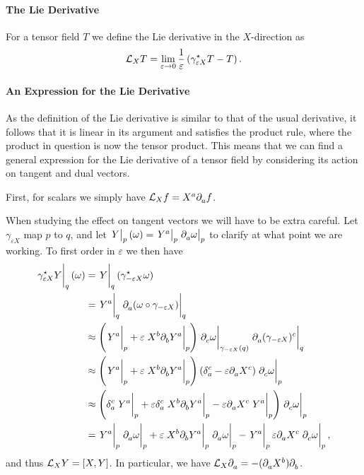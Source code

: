 \paragraph{The Lie Derivative}
For a tensor field $T$ we define the Lie derivative in the $X$-direction as
\begin{align*}
\mathcal{L}_{X}T = \lim\limits_{\varepsilon\to 0}\frac{1}{\varepsilon}\left(\gamma_{\varepsilon X}^{\star}T - T\right).
\end{align*}

\paragraph{An Expression for the Lie Derivative}
As the definition of the Lie derivative is similar to that of the usual derivative, it follows that it is linear in its argument and satisfies the product rule, where the product in question is now the tensor product. This means that we can find a general expression for the Lie derivative of a tensor field by considering its action on tangent and dual vectors.

First, for scalars we simply have $\mathcal{L}_{X}f = X^{a}\partial^{}_{a}f$.

When studying the effect on tangent vectors we will have to be extra careful. Let $\gamma_{\varepsilon X}$ map $p$ to $q$, and let $\eval{Y}_{p}(\omega) = \eval{Y^{a}}_{p}\eval{\del{a}{\omega}}_{p}$ to clarify at what point we are working. To first order in $\varepsilon$ we then have
\begin{align*}
\eval{\pub{\gamma_{\varepsilon X}}{Y}}_{q}(\omega) &= \eval{Y}_{q}(\pub{\gamma_{-\varepsilon X}}{\omega}) \\
&= \eval{Y^{a}}_{q}\eval{\del{a}{(\omega\circ\gamma_{-\varepsilon X})}}_{q} \\
&\approx \left(\eval{Y^{a}}_{p} + \varepsilon\eval{ X^{b}\del{b}{Y^{a}}}_{p}\right) \eval{\del{c}{\omega}}_{\gamma_{-\varepsilon X}(q)}\eval{\del{a}{(\gamma_{-\varepsilon X})^{c}}}_{q} \\
&\approx \left(\eval{Y^{a}}_{p} + \varepsilon\eval{ X^{b}\del{b}{Y^{a}}}_{p}\right) \left(\kdelta{a}{c} - \varepsilon\del{a}{X^{c}}\right)\eval{\del{c}{\omega}}_{p} \\
&\approx \left(\kdelta{a}{c}\eval{Y^{a}}_{p} + \varepsilon\kdelta{a}{c}\eval{ X^{b}\del{b}{Y^{a}}}_{p} - \varepsilon\del{a}{X^{c}}\eval{Y^{a}}_{p}\right)\eval{\del{c}{\omega}}_{p} \\
&= \eval{Y^{a}}_{p}\eval{\del{a}{\omega}}_{p} + \varepsilon\eval{ X^{b}\del{b}{Y^{a}}}_{p}\eval{\del{a}{\omega}}_{p} - \eval{Y^{a}}_{p}\varepsilon\del{a}{X^{c}}\eval{\del{c}{\omega}}_{p},
\end{align*}
and thus $\lied{X}{Y} = \comm{X}{Y}$. In particular, we have $\mathcal{L}_{X}\partial^{}_{a} = -(\partial^{}_{a}X^{b})\partial^{}_{b}$.

